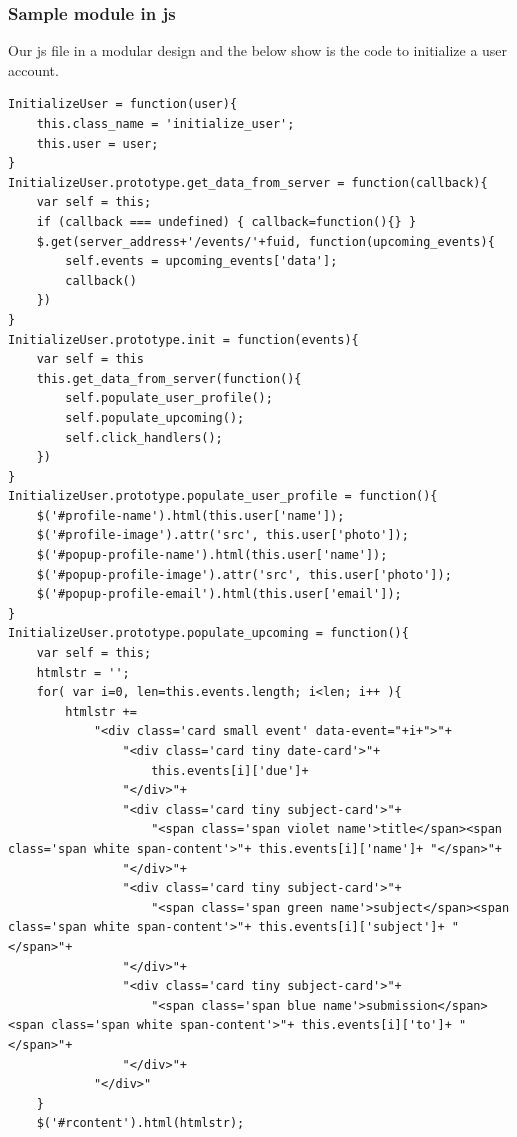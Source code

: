 \documentclass{article}
\begin{document}
\subsubsection{Sample module in js}
Our js file in a modular design and the below show is the code to initialize a user account.
\vspace{1em}

\begin{lstlisting}
InitializeUser = function(user){
    this.class_name = 'initialize_user';
    this.user = user;
}
InitializeUser.prototype.get_data_from_server = function(callback){
    var self = this;
    if (callback === undefined) { callback=function(){} }
    $.get(server_address+'/events/'+fuid, function(upcoming_events){
        self.events = upcoming_events['data'];
        callback()
    })
}
InitializeUser.prototype.init = function(events){
    var self = this
    this.get_data_from_server(function(){
        self.populate_user_profile();
        self.populate_upcoming();
        self.click_handlers();
    })
}
InitializeUser.prototype.populate_user_profile = function(){
    $('#profile-name').html(this.user['name']);
    $('#profile-image').attr('src', this.user['photo']);
    $('#popup-profile-name').html(this.user['name']);
    $('#popup-profile-image').attr('src', this.user['photo']);
    $('#popup-profile-email').html(this.user['email']);
}
InitializeUser.prototype.populate_upcoming = function(){
    var self = this;
    htmlstr = '';
    for( var i=0, len=this.events.length; i<len; i++ ){
        htmlstr +=
            "<div class='card small event' data-event="+i+">"+
                "<div class='card tiny date-card'>"+
                    this.events[i]['due']+
                "</div>"+
                "<div class='card tiny subject-card'>"+
                    "<span class='span violet name'>title</span><span class='span white span-content'>"+ this.events[i]['name']+ "</span>"+
                "</div>"+
                "<div class='card tiny subject-card'>"+
                    "<span class='span green name'>subject</span><span class='span white span-content'>"+ this.events[i]['subject']+ "</span>"+
                "</div>"+
                "<div class='card tiny subject-card'>"+
                    "<span class='span blue name'>submission</span><span class='span white span-content'>"+ this.events[i]['to']+ "</span>"+
                "</div>"+
            "</div>"
    }
    $('#rcontent').html(htmlstr);


\end{lstlisting}
\end{document}
